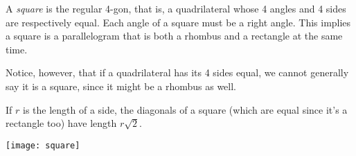 \documentclass[12pt]{article}
\begin{document}
A \emph{square} is the regular 4-gon, that is,  a quadrilateral whose 4 angles and 4 sides are respectively equal.  Each angle of a square must be a right angle. 
This implies a square is a parallelogram that is both a rhombus and a rectangle at the same time.

Notice, however, that if a quadrilateral has its 4 sides equal, we cannot generally say it is a square, since it might be a rhombus as well.

If $r$ is the length of a side, the diagonals of a square (which are equal since it's a rectangle too) have length $r\sqrt{2}$.

\texttt{[image: square]}
\end{document}
